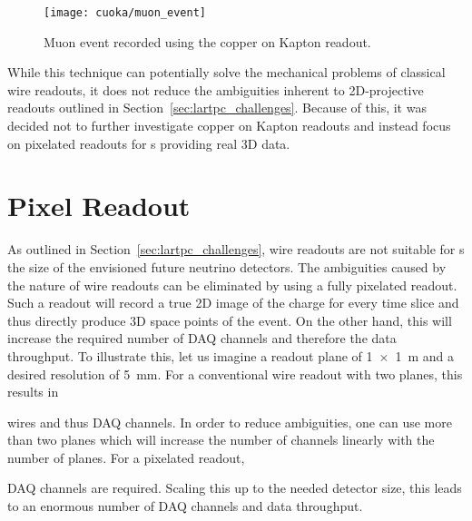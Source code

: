 \begin{figure}[htb]
	\centering
	\texttt{[image: cuoka/muon\_event]}
	\caption{Muon event recorded using the copper on Kapton readout.}
	\label{fig:cuoka_event}
\end{figure}

While this technique can potentially solve the mechanical problems of classical wire readouts, it does not reduce the ambiguities inherent to 2D-projective readouts outlined in Section~\ref{sec:lartpc_challenges}.
Because of this, it was decided not to further investigate copper on Kapton readouts and instead focus on pixelated readouts for \lartpc{}s providing real 3D data.


\section{Pixel Readout}
\label{sec:charge-ro_pixels}

As outlined in Section~\ref{sec:lartpc_challenges}, wire readouts are not suitable for \lartpc{}s the size of the envisioned future neutrino detectors.
The ambiguities caused by the nature of wire readouts can be eliminated by using a fully pixelated readout.
Such a readout will record a true 2D image of the charge for every time slice and thus directly produce 3D space points of the event.
On the other hand, this will increase the required number of DAQ channels and therefore the data throughput.
To illustrate this, let us imagine a readout plane of \SI{1 x 1}{\metre} and a desired resolution of \SI{5}{\milli\metre}.
For a conventional wire readout with two planes, this results in


wires and thus DAQ channels.
In order to reduce ambiguities, one can use more than two planes which will increase the number of channels linearly with the number of planes.
For a pixelated readout,


DAQ channels are required.
Scaling this up to the needed detector size, this leads to an enormous number of DAQ channels and data throughput.

